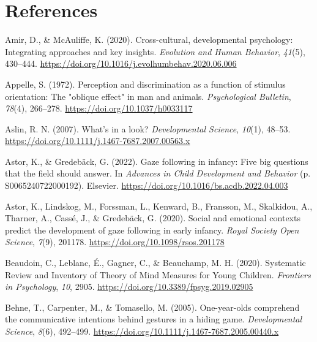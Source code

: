 \documentclass[
  man,mask,floatsintext]{apa7}
\newlength{\cslhangindent}
\newlength{\cslentryspacingunit} %
\newenvironment{CSLReferences}[2] %
 {%
  \setlength{\parindent}{0pt}
  \ifodd #1
  \let\oldpar\par
  \def\par{\hangindent=\cslhangindent\oldpar}
  \fi
  \setlength{\parskip}{#2\cslentryspacingunit}
 }%
 {}
\begin{document}
\newpage

\hypertarget{references}{%
\section{References}\label{references}}

\begingroup
\setlength{\parindent}{-0.5in}
\setlength{\leftskip}{0.5in}

\hypertarget{refs}{}
\begin{CSLReferences}{1}{0}
\leavevmode{}%
Amir, D., \& McAuliffe, K. (2020). Cross-cultural, developmental psychology: Integrating approaches and key insights. \emph{Evolution and Human Behavior}, \emph{41}(5), 430--444. \url{https://doi.org/10.1016/j.evolhumbehav.2020.06.006}

\leavevmode{}%
Appelle, S. (1972). Perception and discrimination as a function of stimulus orientation: {The} "oblique effect" in man and animals. \emph{Psychological Bulletin}, \emph{78}(4), 266--278. \url{https://doi.org/10.1037/h0033117}

\leavevmode{}%
Aslin, R. N. (2007). What's in a look? \emph{Developmental Science}, \emph{10}(1), 48--53. \url{https://doi.org/10.1111/j.1467-7687.2007.00563.x}

\leavevmode{}%
Astor, K., \& Gredebäck, G. (2022). Gaze following in infancy: {Five} big questions that the field should answer. In \emph{Advances in {Child Development} and {Behavior}} (p. S0065240722000192). Elsevier. \url{https://doi.org/10.1016/bs.acdb.2022.04.003}

\leavevmode{}%
Astor, K., Lindskog, M., Forssman, L., Kenward, B., Fransson, M., Skalkidou, A., Tharner, A., Cassé, J., \& Gredebäck, G. (2020). Social and emotional contexts predict the development of gaze following in early infancy. \emph{Royal Society Open Science}, \emph{7}(9), 201178. \url{https://doi.org/10.1098/rsos.201178}

\leavevmode{}%
Beaudoin, C., Leblanc, É., Gagner, C., \& Beauchamp, M. H. (2020). Systematic {Review} and {Inventory} of {Theory} of {Mind Measures} for {Young Children}. \emph{Frontiers in Psychology}, \emph{10}, 2905. \url{https://doi.org/10.3389/fpsyg.2019.02905}

\leavevmode{}%
Behne, T., Carpenter, M., \& Tomasello, M. (2005). One-year-olds comprehend the communicative intentions behind gestures in a hiding game. \emph{Developmental Science}, \emph{8}(6), 492--499. \url{https://doi.org/10.1111/j.1467-7687.2005.00440.x}


\end{CSLReferences}
\end{document}
